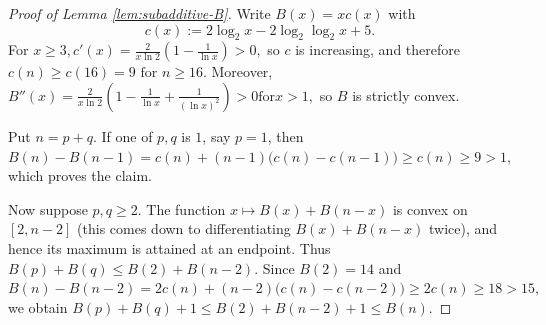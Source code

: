 \documentclass[10pt,a4paper]{amsart}
\renewcommand{\geq}{\geqslant}
\renewcommand{\leq}{\leqslant}
\begin{document}
\begin{proof}[Proof of Lemma \ref{lem:subadditive-B}]
Write
$B(x)=x c(x)$ with
$$c(x):=2\log_2x-2\log_2\log_2x+5.$$
For $x\geq3,c'(x)=\frac{2}{x\ln2}\left(1-\frac1{\ln x}\right)>0,$ so $c$ is increasing, and therefore $c(n)\geq c(16)=9\text{ for }n\geq16.$
Moreover, $B''(x)=\frac{2}{x\ln2}\left(1-\frac1{\ln x}+\frac1{(\ln x)^2}\right)>0\text{for}x>1,$ so $B$ is strictly convex.

Put $n=p+q$.  If one of $p,q$ is $1$, say $p=1$, then $B(n)-B(n-1)=c(n)+(n-1)\bigl(c(n)-c(n-1)\bigr)\geq c(n)\geq9>1,$ which proves the claim.

Now suppose $p,q\geq2$.  The function $x\mapsto B(x)+B(n-x)$ is convex on $[2,n-2]$ (this comes down to differentiating $B(x)+B(n-x)$ twice), and hence its maximum is attained at an
endpoint.  Thus $B(p)+B(q)\leq B(2)+B(n-2).$
Since $B(2)=14$ and $B(n)-B(n-2)=2c(n)+(n-2)\bigl(c(n)-c(n-2)\bigr)\geq2c(n)\geq18>15,$ we obtain $B(p)+B(q)+1\leq B(2)+B(n-2)+1\leq B(n).$

\end{proof}
\end{document}
